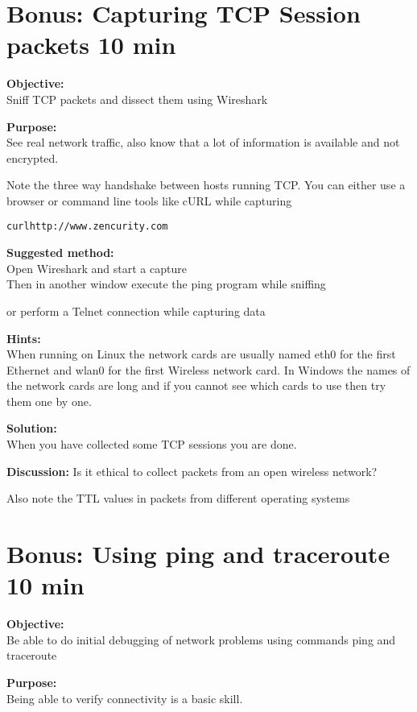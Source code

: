 \documentclass[a4paper,11pt,notitlepage]{report}
\begin{document}
\chapter{Bonus: Capturing TCP Session packets 10 min}
\label{ex:wireshark-capture}



{\bf Objective:}\\
Sniff TCP packets and dissect them using Wireshark

{\bf Purpose:}\\
See real network traffic, also know that a lot of information is available and not encrypted.

Note the three way handshake between hosts running TCP. You can either use a browser or command line tools like cURL while capturing

\begin{alltt}
curl http://www.zencurity.com
\end{alltt}

{\bf Suggested method:}\\
Open Wireshark and start a capture\\
Then in another window execute the ping program while sniffing

or perform a Telnet connection while capturing data

{\bf Hints:}\\
When running on Linux the network cards are usually named eth0 for the first Ethernet and wlan0 for the first Wireless network card. In Windows the names of the network cards are long and if you cannot see which cards to use then try them one by one.

{\bf Solution:}\\
When you have collected some TCP sessions you are done.

{\bf Discussion:}
Is it ethical to collect packets from an open wireless network?

Also note the TTL values in packets from different operating systems

\chapter{Bonus: Using ping and traceroute 10 min}
\label{ex:ping}

{\bf Objective:}\\
Be able to do initial debugging of network problems using commands ping and traceroute

{\bf Purpose:}\\
Being able to verify connectivity is a basic skill.
\end{document}

